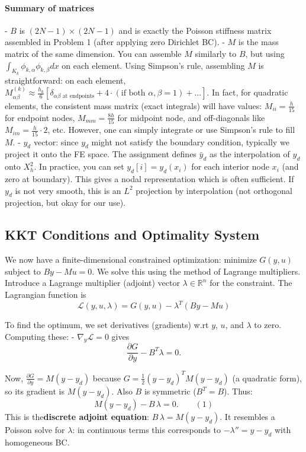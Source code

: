 \documentclass[a4paper,10pt]{report}
\begin{document}
\paragraph{Summary of matrices}
- \(B\) is \((2N-1)\times(2N-1)\) and is exactly the Poisson stiffness matrix assembled in Problem 1 (after applying zero Dirichlet BC).
- \(M\) is the mass matrix of the same dimension. You can assemble \(M\) similarly to \(B\), but using \(\int_{K_k} \phi_{k,\alpha}\phi_{k,\beta} dx\) on each element. Using Simpson's rule, assembling \(M\) is straightforward: on each element, \(M^{(k)}_{\alpha\beta} \approx \frac{h_k}{6} [\delta_{\alpha\beta \text{ at endpoints}} + 4\cdot (\text{if both }\alpha,\beta=1) + ...]\).
In fact, for quadratic elements, the consistent mass matrix (exact integrals) will have values: \(M_{ii} = \frac{h}{15}\) for endpoint nodes, \(M_{mm}=\frac{8h}{15}\) for midpoint node, and off-diagonals like \(M_{im} = \frac{h}{15}\cdot 2\), etc. However, one can simply integrate or use Simpson's rule to fill \(M\).
- \(y_d\) vector: since \(y_d\) might not satisfy the boundary condition, typically we project it onto the FE space. The assignment defines \(\bar{y}_d\) as the interpolation of \(y_d\) onto \(X_h^2\). In practice, you can set \(y_d[i] = y_d(x_i)\) for each interior node \(x_i\) (and zero at boundary). This gives a nodal representation which is often sufficient. If \(y_d\) is not very smooth, this is an \(L^2\) projection by interpolation (not orthogonal projection, but okay for our use).

\subsection{KKT Conditions and Optimality System}
We now have a finite-dimensional constrained optimization: minimize \(G(y,u)\) subject to \(B y - M u = 0\). We solve this using the method of Lagrange multipliers.
Introduce a Lagrange multiplier (adjoint) vector \(\lambda \in \mathbb{R}^n\) for the constraint. The Lagrangian function is
\[\mathcal{L}(y,u,\lambda) = G(y,u) - \lambda^T (B y - M u)\]

To find the optimum, we set derivatives (gradients) w.rt \(y\), \(u\), and \(\lambda\) to zero.
Computing these:
- \(\nabla_y \mathcal{L} = 0\) gives
\[\frac{\partial G}{\partial y} - B^T \lambda = 0.\]

Now, \(\frac{\partial G}{\partial y} = M(y - y_d)\) because \(G = \frac{1}{2}(y-y_d)^T M (y-y_d)\) (a quadratic form), so its gradient is \(M(y - y_d)\). Also \(B\) is symmetric (\(B^T = B\)). Thus:
\[M (y - y_d) - B\,\lambda = 0. \qquad (1)\]
This is the\textbf{discrete adjoint equation}: \(B\,\lambda = M (y - y_d)\). It resembles a Poisson solve for \(\lambda\): in continuous terms this corresponds to \(- \lambda'' = y - y_d\) with homogeneous BC.
\end{document}
